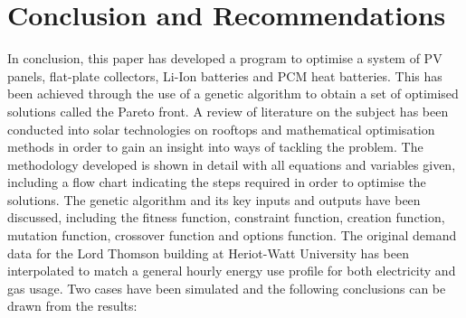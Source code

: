 \section{Conclusion and Recommendations}

In conclusion, this paper has developed a program to optimise a system of PV panels, flat-plate collectors, Li-Ion batteries and PCM heat batteries. This has been achieved through the use of a genetic algorithm to obtain a set of optimised solutions called the Pareto front. A review of literature on the subject has been conducted into solar technologies on rooftops and mathematical optimisation methods in order to gain an insight into ways of tackling the problem. The methodology developed is shown in detail with all equations and variables given, including a flow chart indicating the steps required in order to optimise the solutions. The genetic algorithm and its key inputs and outputs have been discussed, including the fitness function, constraint function, creation function, mutation function, crossover function and options function. The original demand data for the Lord Thomson building at Heriot-Watt University has been interpolated to match a general hourly energy use profile for both electricity and gas usage. 
\newline
Two cases have been simulated and the following conclusions can be drawn from the results: 

